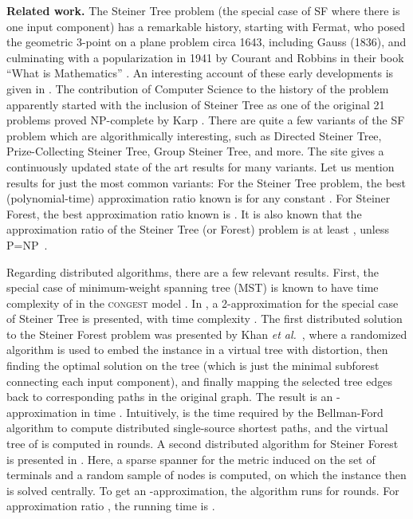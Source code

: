 \documentclass[letterpaper,11pt]{article}
\newcommand{\Congest}{\textsc{congest}\xspace}
\renewcommand{\paragraph}[1]{\smallskip\par\noindent\textbf{#1}}
\begin{document}
\paragraph{Related work.}
The Steiner Tree problem (the special case of SF where there is one
input component) has a remarkable history, starting with Fermat, who
posed the geometric 3-point on a plane problem circa 1643, including
Gauss (1836), and culminating with a popularization in 1941 by Courant
and Robbins in their book ``What is Mathematics'' \cite{CourantR-41}. An
interesting account of these early developments is given in
\cite{SteinerHistory}.
The contribution of Computer Science to the history of the problem apparently
started with the inclusion of Steiner Tree as one of the original 21 problems
proved NP-complete by Karp \cite{Karp-72}. There are quite a few variants of the
SF problem which are algorithmically interesting, such as Directed Steiner Tree,
Prize-Collecting Steiner Tree, Group Steiner Tree, and more. The site
\cite{Steiner-site} gives a continuously updated state of the
art results for many variants. Let us mention results for just the most common
variants: For the Steiner Tree problem, the best (polynomial-time) approximation
ratio known is  for any constant
 \cite{ByrkaGRS-10}. For Steiner Forest, the best approximation
ratio known is  \cite{AgrawalKR-95}. It is also known that the
approximation ratio of the Steiner Tree (or Forest) problem is  at least
, unless P=NP~\cite{ChlebikC-08}.

Regarding distributed algorithms, there are a few relevant results. First, the
special case of minimum-weight spanning tree (MST) is known to have time
complexity of  in the \Congest model
\cite{DHKNPPW-11,Elkin-MST,GarayKP-98,KuttenP-98,PelegR-00}. In \cite{CF05}, a
2-approximation for the special case of Steiner Tree is presented, with time
complexity . The first distributed solution to the Steiner Forest
problem was presented by Khan \textit{et al.}~\cite{KKMPT-12}, where a
randomized algorithm is used to embed the instance in a virtual tree with
 distortion, then finding the optimal solution on the tree (which
is just the minimal subforest connecting each input component), and finally
mapping the selected tree edges back to corresponding paths in the original
graph. The result is an -approximation in time .
Intuitively,  is the time required by the Bellman-Ford algorithm to compute
distributed single-source shortest paths, and the virtual tree of
\cite{KKMPT-12} is computed in  rounds.
A second distributed algorithm for Steiner Forest is presented in
\cite{LenzenP13}.
Here, a sparse spanner for the metric induced on the set of terminals and a
random sample of  nodes is computed, on which the
instance then is solved centrally. To get an
-approximation, the algorithm runs for  rounds. For approximation ratio ,
the running time is . 
\end{document}
